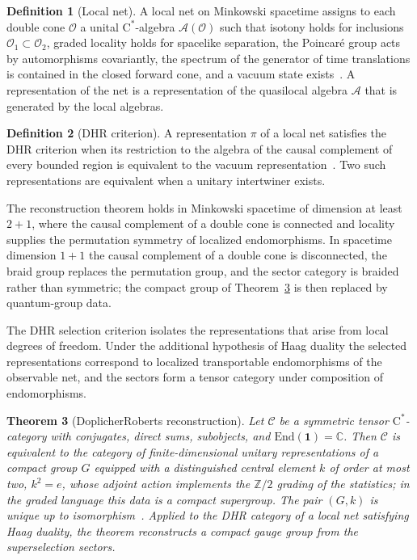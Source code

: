 \documentclass[11pt,letterpaper]{article}
\newtheorem{theorem}{Theorem}[section]
\theoremstyle{definition}
\newtheorem{definition}[theorem]{Definition}
\theoremstyle{remark}
\begin{document}
\begin{definition}[Local net]
\label{def:local-net}
A local net on Minkowski spacetime assigns to each double cone $\mathcal{O}$ a unital $\mathrm{C}^*$-algebra $\mathcal{A}(\mathcal{O})$ such that isotony holds for inclusions $\mathcal{O}_1 \subset \mathcal{O}_2$, graded locality holds for spacelike separation, the Poincar\'e group acts by automorphisms covariantly, the spectrum of the generator of time translations is contained in the closed forward cone, and a vacuum state exists~\cite{haag-kastler}. A representation of the net is a representation of the quasilocal algebra $\mathcal{A}$ that is generated by the local algebras.
\end{definition}

\begin{definition}[DHR criterion]
\label{def:dhr}
A representation $\pi$ of a local net satisfies the DHR criterion when its restriction to the algebra of the causal complement of every bounded region is equivalent to the vacuum representation~\cite{dhr}. Two such representations are equivalent when a unitary intertwiner exists.
\end{definition}

The reconstruction theorem holds in Minkowski spacetime of dimension at least $2+1$, where the causal complement of a double cone is connected and locality supplies the permutation symmetry of localized endomorphisms. In spacetime dimension $1+1$ the causal complement of a double cone is disconnected, the braid group replaces the permutation group, and the sector category is braided rather than symmetric; the compact group of Theorem~\ref{thm:dr} is then replaced by quantum-group data.

The DHR selection criterion isolates the representations that arise from local degrees of freedom. Under the additional hypothesis of Haag duality the selected representations correspond to localized transportable endomorphisms of the observable net, and the sectors form a tensor category under composition of endomorphisms.

\begin{theorem}[Doplicher\textendash{}Roberts reconstruction]
\label{thm:dr}
Let $\mathcal{C}$ be a symmetric tensor $\mathrm{C}^*$-category with conjugates, direct sums, subobjects, and $\mathrm{End}(\mathbf{1}) = \mathbb{C}$. Then $\mathcal{C}$ is equivalent to the category of finite-dimensional unitary representations of a compact group $G$ equipped with a distinguished central element $k$ of order at most two, $k^2 = e$, whose adjoint action implements the $\mathbb{Z}/2$ grading of the statistics; in the graded language this data is a compact supergroup. The pair $(G, k)$ is unique up to isomorphism~\cite{dr, dhr}. Applied to the DHR category of a local net satisfying Haag duality, the theorem reconstructs a compact gauge group from the superselection sectors.
\end{theorem}
\end{document}

